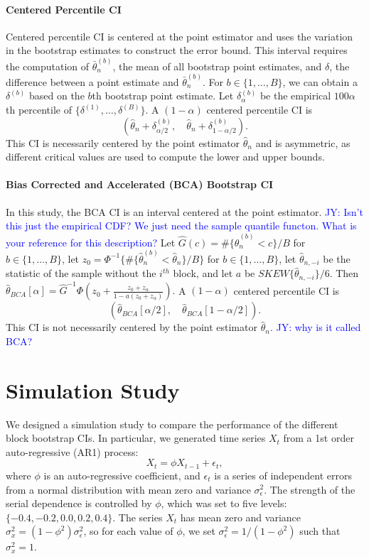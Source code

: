\documentclass[12pt, letterpaper, titlepage]{article}
\newcommand{\jy}[1]{\textcolor{blue}{JY: #1}}
\begin{document}
\paragraph{Centered Percentile CI}
Centered percentile CI is centered at the point estimator and uses the
variation
in the bootstrap estimates to construct the error bound. This interval requires
the computation of $\bar\theta_n^{(b)}$, the mean of all bootstrap point
estimates, and $\delta$, the difference between a point estimate and
$\bar\theta_n^{(b)}$. For $b \in \{1, \ldots, B\}$, we can obtain a
$\delta^{(b)}$ based on the $b$th bootstrap point estimate. Let
$\delta_{\alpha}^{(b)}$ be the empirical $100\alpha$th percentile of
$\{\delta^{(1)}, \ldots,  \delta^{(B)}\}$.  
A $(1 - \alpha)$ centered percentile CI is
\[
(\hat{\theta}_{n} + \delta^{(b)}_{\alpha/2}, \quad
\hat{\theta}_{n} + \delta^{(b)}_{1 - \alpha/2}).
\]
This CI is necessarily centered by the point estimator $\hat\theta_n$ and is
asymmetric, as different critical values are used to compute
the lower and upper bounds.


\paragraph{Bias Corrected and Accelerated (BCA) Bootstrap CI}
In this study, the BCA CI is an interval centered at the point estimator.
\jy{Isn't this just the empirical CDF? We just need the sample quantile functon.
  What is your reference for this description?}
Let $\hat{G}(c) = \#\{\hat\theta_n^{(b)} < c\}/B$ for $b \in \{1, \ldots, B\}$, let
$z_0 = \Phi^{-1}\{\#\{\hat\theta_n^{(b)} < \hat{\theta}_n\} / B\}$ for $b \in \{1, \ldots, B\}$, let
$\hat{\theta}_{n, -i}$ be the statistic of the sample without the $i^{th}$
block, and let $a$ be $SKEW\{\hat{\theta}_{n, -i}\} / 6$. Then
 $\hat\theta_{BCA}[\alpha] = \hat{G}^{-1}\Phi(z_0 + \frac{z_{0} + z_{\alpha}}{1 - a(z_{0} + z_{\alpha})}).$
A $(1 - \alpha)$ centered percentile CI is
\[
(\hat\theta_{BCA}[\alpha/2], \quad
\hat\theta_{BCA}[1 - \alpha/2]).
\]
This CI is not necessarily centered by the point estimator $\hat\theta_n$.
\jy{why is it called BCA?}


\section{Simulation Study}
\label{sec:simu}

We designed a simulation study to compare the performance of the different
block
bootstrap CIs. In particular, we generated time series $X_t$
from a 1st order auto-regressive (AR1) process:
\[
X_t = \phi X_{t-1} + \epsilon_t,
\]
where $\phi$ is an auto-regressive coefficient, and $\epsilon_t$ is a series of
independent errors from a normal distribution with mean zero and variance
$\sigma_{\epsilon}^2$. The strength of the serial dependence is controlled by
$\phi$, which was set to five levels: $\{-0.4, -0.2, 0.0, 0.2, 0.4\}$.
The series $X_t$ has mean zero and variance
$\sigma_x^2 = (1 - \phi^2) \sigma_{\epsilon}^2$, so for each value of $\phi$,
we
set $\sigma_{\epsilon}^2 = 1 / (1 - \phi^2)$ such that $\sigma_x^2 = 1$.
\end{document}
